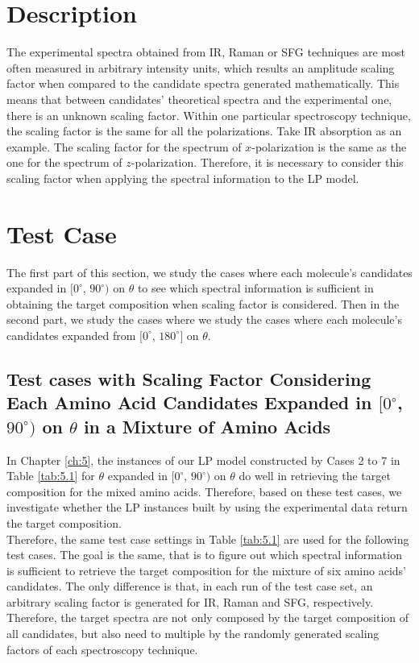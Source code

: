  \label{ch:6}
\section{Description}
The experimental spectra obtained from IR, Raman or SFG techniques are most often measured in arbitrary intensity units, which results an amplitude scaling factor when compared to the candidate spectra generated mathematically. This means that between candidates' theoretical spectra and the experimental one, there is an unknown scaling factor. Within one particular spectroscopy technique, the scaling factor is the same for all the polarizations. Take IR absorption as an example. The scaling factor for the spectrum of $x$-polarization is the same as the one for the spectrum of $z$-polarization. Therefore, it is necessary to consider this scaling factor when applying the spectral information to the LP model. \\

\section{Test Case}
The first part of this section, we study the cases where each molecule's candidates expanded in $[0^{\circ}$, $90^{\circ})$ on $\theta$ to see which spectral information is sufficient in obtaining the target composition when scaling factor is considered. Then in the second part, we study the cases where we study the cases where each molecule's candidates expanded from $[0^{\circ}$, $180^{\circ}]$ on $\theta$. \\

\subsection{Test cases with Scaling Factor Considering Each Amino Acid Candidates Expanded in $[0^{\circ}$, $90^{\circ})$ on $\theta$ in a Mixture of Amino Acids}
In Chapter \ref{ch:5}, the instances of our LP model constructed by Cases 2 to 7 in Table \ref{tab:5.1} for $\theta$ expanded in $[0^{\circ}$, $90^{\circ})$ on $\theta$ do well in retrieving the target composition for the mixed amino acids. Therefore, based on these test cases, we investigate whether the LP instances built by using the experimental data return the target composition.\\

Therefore, the same test case settings in Table \ref{tab:5.1} are used for the following test cases. The goal is the same, that is to figure out which spectral information is sufficient to retrieve the target composition for the mixture of six amino acids' candidates. The only difference is that, in each run of the test case set, an arbitrary scaling factor is generated for IR, Raman and SFG, respectively. Therefore, the target spectra are not only composed by the target composition of all candidates, but also need to multiple by the randomly generated scaling factors of each spectroscopy technique. \\

